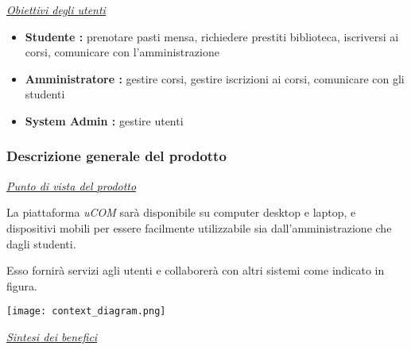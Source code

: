 \underline{\textit{Obiettivi degli utenti}}

\begin{itemize}
	\item \textbf{Studente :} prenotare pasti mensa, richiedere prestiti
	biblioteca, iscriversi ai corsi, comunicare con l'amministrazione
	\item \textbf{Amministratore :} gestire corsi, gestire iscrizioni ai corsi, comunicare con gli studenti
	\item \textbf{System Admin :} gestire utenti
\end{itemize}

\newpage

\subsubsection{Descrizione generale del prodotto}

\underline{\textit{Punto di vista del prodotto}}

La piattaforma \textit{uCOM} sarà disponibile su computer desktop e laptop, e dispositivi mobili per essere facilmente utilizzabile sia dall'amministrazione che dagli studenti.

Esso fornirà servizi agli utenti e collaborerà con altri sistemi come indicato in figura.

\texttt{[image: context\_diagram.png]}

\underline{\textit{Sintesi dei benefici}}

